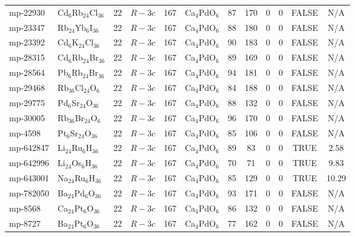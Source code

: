{\begin{longtable}{llcccccccccc}
    mp-22930 & Cd$_{6}$Rb$_{24}$Cl$_{36}$ & 22    & $R-3c$ & 167   & Ca$_{4}$PdO$_{6}$ & 87    & 170   & 0     & 0     & FALSE & N/A \\
    mp-23347 & Rb$_{24}$Yb$_{6}$I$_{36}$ & 22    & $R-3c$ & 167   & Ca$_{4}$PdO$_{6}$ & 88    & 180   & 0     & 0     & FALSE & N/A \\
    mp-23392 & Cd$_{6}$K$_{24}$Cl$_{36}$ & 22    & $R-3c$ & 167   & Ca$_{4}$PdO$_{6}$ & 90    & 183   & 0     & 0     & FALSE & N/A \\
    mp-28315 & Cd$_{6}$Rb$_{24}$Br$_{36}$ & 22    & $R-3c$ & 167   & Ca$_{4}$PdO$_{6}$ & 89    & 169   & 0     & 0     & FALSE & N/A \\
    mp-28564 & Pb$_{6}$Rb$_{24}$Br$_{36}$ & 22    & $R-3c$ & 167   & Ca$_{4}$PdO$_{6}$ & 94    & 181   & 0     & 0     & FALSE & N/A \\
    mp-29468 & Rb$_{36}$Cl$_{24}$O$_{6}$ & 22    & $R-3c$ & 167   & Ca$_{4}$PdO$_{6}$ & 84    & 188   & 0     & 0     & FALSE & N/A \\
    mp-29775 & Pd$_{6}$Sr$_{24}$O$_{36}$ & 22    & $R-3c$ & 167   & Ca$_{4}$PdO$_{6}$ & 88    & 132   & 0     & 0     & FALSE & N/A \\
    mp-30005 & Rb$_{36}$Br$_{24}$O$_{6}$ & 22    & $R-3c$ & 167   & Ca$_{4}$PdO$_{6}$ & 96    & 170   & 0     & 0     & FALSE & N/A \\
    mp-4598 & Pt$_{6}$Sr$_{24}$O$_{36}$ & 22    & $R-3c$ & 167   & Ca$_{4}$PdO$_{6}$ & 85    & 106   & 0     & 0     & FALSE & N/A \\
    mp-642847 & Li$_{24}$Ru$_{6}$H$_{36}$ & 22    & $R-3c$ & 167   & Ca$_{4}$PdO$_{6}$ & 89    & 83    & 0     & 0     & TRUE  & 2.58  \\
    mp-642996 & Li$_{24}$Os$_{6}$H$_{36}$ & 22    & $R-3c$ & 167   & Ca$_{4}$PdO$_{6}$ & 70    & 71    & 0     & 0     & TRUE  & 9.83  \\
    mp-643001 & Na$_{24}$Ru$_{6}$H$_{36}$ & 22    & $R-3c$ & 167   & Ca$_{4}$PdO$_{6}$ & 85    & 129   & 0     & 0     & TRUE  & 10.29  \\
    mp-782050 & Ba$_{24}$Pd$_{6}$O$_{36}$ & 22    & $R-3c$ & 167   & Ca$_{4}$PdO$_{6}$ & 93    & 171   & 0     & 0     & FALSE & N/A \\
    mp-8568 & Ca$_{24}$Pt$_{6}$O$_{36}$ & 22    & $R-3c$ & 167   & Ca$_{4}$PdO$_{6}$ & 86    & 132   & 0     & 0     & FALSE & N/A \\
    mp-8727 & Ba$_{24}$Pt$_{6}$O$_{36}$ & 22    & $R-3c$ & 167   & Ca$_{4}$PdO$_{6}$ & 77    & 162   & 0     & 0     & FALSE & N/A \\

\end{longtable}}
